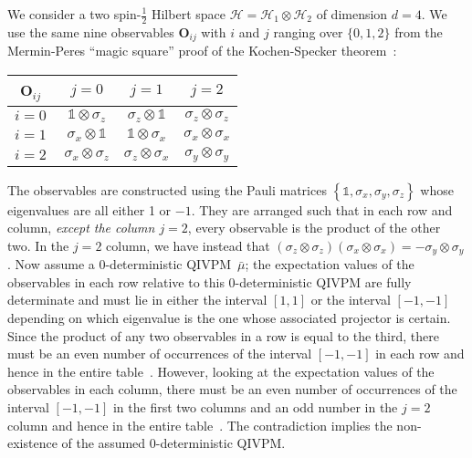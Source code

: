 \documentclass[english,reprint, aps, prl,superscriptaddress, showpacs,
showkeys, longbibliography, amsmath, amssymb, floatfix]{revtex4-1}
\theoremstyle{plain}
\theoremstyle{definition}
\newcommand{\Hilb}{\mathcal{H}}
\begin{document}
We consider a two spin-$\frac{1}{2}$ Hilbert space
$\Hilb=\Hilb_1\otimes\Hilb_2$ of dimension $d=4$. We use the same nine
observables $\mathbf{O}_{ij}$ with $i$ and $j$ ranging over
$\{0,1,2\}$ from the Mermin-Peres ``magic square'' proof of the
Kochen-Specker theorem~\cite{Mermin1990Simple,peres1995quantum}:

{\renewcommand{\arraystretch}{2}%
\begin{center}
\begin{tabular}{r|@{\quad}c@{\quad}|@{\quad}c@{\quad}|@{\quad}c@{\quad}|}
$\mathbf{O}_{ij}$~ & $j=0$ & $j=1$ & $j=2$ \\
\hline 
$i=0~$ & $\mathbb{1}\otimes\sigma_{z}$  & $\sigma_{z}\otimes\mathbb{1}$  & $\sigma_{z}\otimes\sigma_{z}$ \tabularnewline
\hline 
$i=1~$ & $\sigma_{x}\otimes\mathbb{1}$  & $\mathbb{1}\otimes\sigma_{x}$  & $\sigma_{x}\otimes\sigma_{x}$ \tabularnewline
\hline 
$i=2~$ & $\sigma_{x}\otimes\sigma_{z}$  & $\sigma_{z}\otimes\sigma_{x}$  & $\sigma_{y}\otimes\sigma_{y}$ \tabularnewline
\hline 
\end{tabular}
\par\end{center}
} 

\noindent The observables are constructed using the Pauli matrices
$\left\{ \mathbb{1},\sigma_{x},\sigma_{y},\sigma_{z}\right\}$ whose
eigenvalues are all either 1 or $-1$. They are arranged such that in
each row and column, \emph{except the column $j=2$}, every observable
is the product of the other two. In the $j=2$ column, we have instead
that
$\left(\sigma_{z}\otimes\sigma_{z}\right)\left(\sigma_{x}\otimes\sigma_{x}\right)=-\sigma_{y}\otimes\sigma_{y}$. Now
assume a 0-deterministic QIVPM~${\bar{\mu}}$; the expectation values
of the observables in each row relative to this 0-deterministic QIVPM
are fully determinate and must lie in either the interval $[1,1]$ or
the interval $[-1,-1]$ depending on which eigenvalue is the one whose
associated projector is certain. Since the product of any two
observables in a row is equal to the third, there must be an even
number of occurrences of the interval $[-1,-1]$ in each row and hence
in the entire table~\citep{HOSTunpublished}. However, looking at the expectation values of the
observables in each column, there must be an even number of
occurrences of the interval $[-1,-1]$ in the first two columns and an
odd number in the $j=2$ column and hence in the entire table~\citep{HOSTunpublished}. The
contradiction implies the non-existence of the assumed 0-deterministic
QIVPM. 
\end{document}
